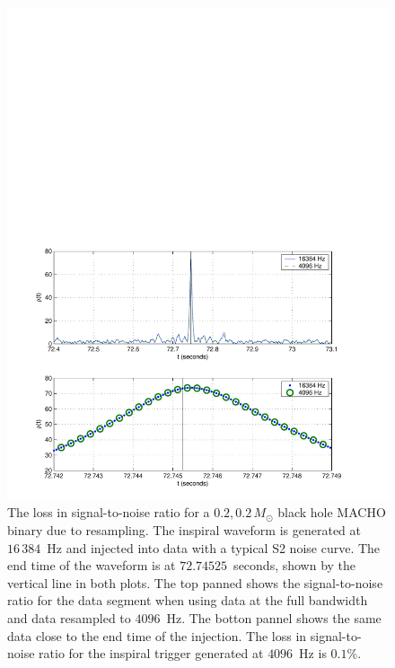 \begin{figure}[p]
\begin{center}
\includegraphics[width=\linewidth]{figures/pipeline/snr_resample_loss}
\end{center}
\caption{\label{f:snr_resample_loss}%
The loss in signal-to-noise ratio for a $0.2,0.2\, M_\odot$ black hole
MACHO binary due to resampling. The inspiral waveform is generated at
$16\,384$~Hz and injected into data with a typical S2 noise curve. The end
time of the waveform is at $72.74525$~seconds, shown by the vertical line in
both plots. The top panned shows the signal-to-noise ratio for the data
segment when using data at the full bandwidth and data resampled to 
$4096$~Hz. The botton pannel shows the same data close to the end time of the
injection. The loss in signal-to-noise ratio for the inspiral trigger 
generated at $4096$~Hz is $0.1\%$.
}
\end{figure}


